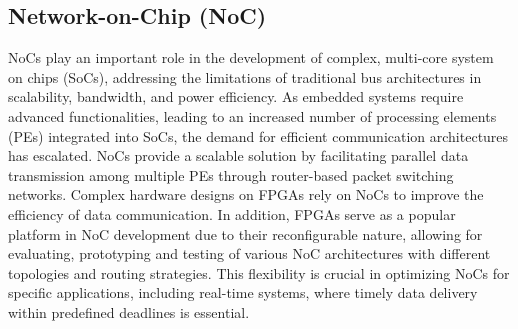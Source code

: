 \subsection{Network-on-Chip (NoC)}
NoCs play an important role in the development of complex, multi-core system on chips (SoCs), addressing the limitations of traditional bus architectures in scalability, bandwidth, and power efficiency. As embedded systems require advanced functionalities, leading to an increased number of processing elements (PEs) integrated into SoCs, the demand for efficient communication architectures has escalated. NoCs provide a scalable solution by facilitating parallel data transmission among multiple PEs through router-based packet switching networks. Complex hardware designs on FPGAs rely on %
NoCs to improve the efficiency of data communication. In addition, FPGAs serve as a popular platform in NoC development due to their reconfigurable nature, allowing for evaluating, prototyping and testing of various NoC architectures with different topologies and routing strategies. This flexibility is crucial in optimizing NoCs for specific applications, including real-time systems, where timely data delivery within predefined deadlines is essential.


